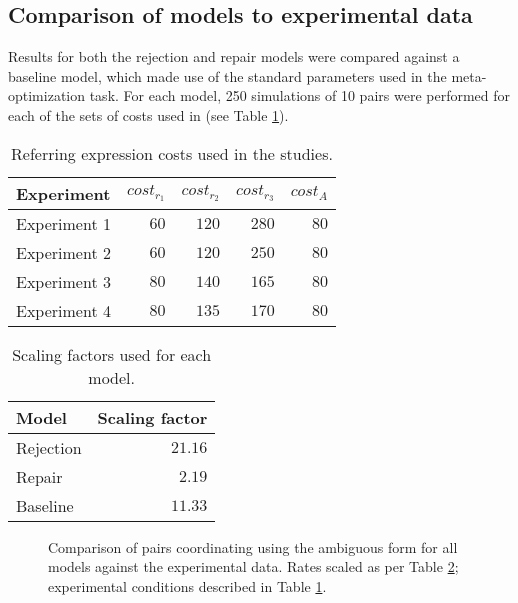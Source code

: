 \documentclass[12pt,a4paper]{article}
\begin{document}
\subsection{Comparison of models to experimental data}
\label{sec:model_comparison}
Results for both the rejection and repair models were compared against a baseline model, which made use of the standard parameters used in the meta-optimization task. For each model, 250 simulations of 10 pairs were performed for each of the sets of costs used in \citeauthor{rohde2012} (see Table \ref{table:2}).
\begin{table}
\begin{center}
    \begin{tabular}{ l r r r r }
    Experiment & $cost_{r_1}$ & $cost_{r_2}$ & $cost_{r_3}$ & $cost_A$\\ \hline
    Experiment 1 & $60$ & $120$ & $280$ & $80$ \\ \hline
    Experiment 2 & $60$ & $120$ & $250$ & $80$ \\ \hline
    Experiment 3 & $80$ & $140$ & $165$ & $80$ \\ \hline
    Experiment 4 & $80$ & $135$ & $170$ & $80$ \\ 
    \end{tabular}
    \caption{Referring expression costs used in the \citeauthor{rohde2012} studies.}
    \label{table:2}
\end{center}
\end{table}

\begin{table}
\begin{center}
    \begin{tabular}{ l r }
    Model & Scaling factor \\ \hline
    Rejection & $21.16$ \\ \hline
    Repair & $2.19$ \\ \hline
    Baseline & $11.33$ \\ \hline
    \end{tabular}
    \caption{Scaling factors used for each model.}
    \label{table:3}
\end{center}
\end{table}

\begin{figure}
\centering
\scalebox{.65}{}
\caption{Comparison of pairs coordinating using the ambiguous form for all models against the experimental data. Rates scaled as per Table \ref{table:3}; experimental conditions described in Table \ref{table:2}.}
\label{fig:model_comp}
\end{figure}
\end{document}
